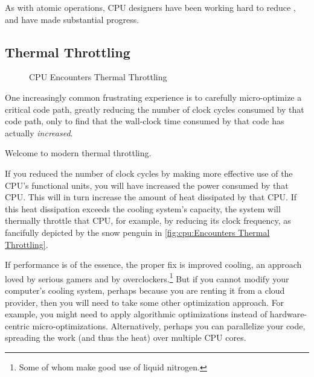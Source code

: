 As with atomic operations, CPU designers have been working hard to
reduce , and have made substantial progress.

\subsection{Thermal Throttling}
\label{sec:cpu:Thermal Throttling}

\begin{figure}
\centering
{}
\caption{CPU Encounters Thermal Throttling}
\end{figure}

One increasingly common frustrating experience is to carefully
micro-optimize a critical code path, greatly reducing the number of
clock cycles consumed by that code path, only to find that the
wall-clock time consumed by that code has actually \emph{increased}.

Welcome to modern thermal throttling.

If you reduced the number of clock cycles by making more effective
use of the CPU's functional units, you will have increased the
power consumed by that CPU\@.
This will in turn increase the amount of heat dissipated by that CPU\@.
If this heat dissipation exceeds the cooling system's capacity, the
system will thermally throttle that CPU, for example, by reducing
its clock frequency, as fancifully depicted by the snow penguin in
\cref{fig:cpu:Encounters Thermal Throttling}.

If performance is of the essence, the proper fix is improved cooling,
an approach loved by serious gamers and by overclockers.\footnote{
	Some of whom make good use of liquid nitrogen.}
But if you cannot modify your computer's cooling system, perhaps because
you are renting it from a cloud provider, then you will need to take
some other optimization approach.
For example, you might need to apply algorithmic optimizations instead
of hardware-centric micro-optimizations.
Alternatively, perhaps you can parallelize your code, spreading the
work (and thus the heat) over multiple CPU cores.

